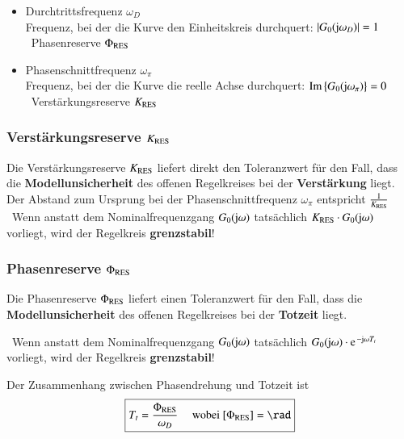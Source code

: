 \begin{itemize}
    \item Durchtrittsfrequenz $\omega_{D}$ \\
        Frequenz, bei der die Kurve den Einheitskreis durchquert: $| G_{0}(\mathrm{j} \omega_{D})| = 1 $ \\
        \textrightarrow\ Phasenreserve $\Phi_{\rm RES}$
    
    \item Phasenschnittfrequenz $\omega_{\pi}$ \\
        Frequenz, bei der die Kurve die reelle Achse durchquert: $\operatorname{Im}\left\{G_{0}(\mathrm{j} \omega_{\pi})\right\} = 0$\\
        \textrightarrow\ Verstärkungsreserve $K_{\rm RES}$
\end{itemize}


\subsubsection{Verstärkungsreserve $K_{\rm RES}$}

Die Verstärkungsreserve $K_{\rm RES}$ liefert direkt den Toleranzwert für den Fall, dass die \textbf{Modellunsicherheit} des 
offenen Regelkreises bei der \textbf{Verstärkung} liegt. \\
Der Abstand zum Ursprung bei der Phasenschnittfrequenz $\omega_{\pi}$ entspricht $\frac{1}{K_{\rm RES}}$ \\
\textrightarrow\ Wenn anstatt dem Nominalfrequenzgang $G_0(\mathrm{j} \omega)$ tatsächlich $K_{\rm RES} \cdot G_0(\mathrm{j} \omega)$ vorliegt, wird der
Regelkreis \textbf{grenzstabil}!


\subsubsection{Phasenreserve $\Phi_{\rm RES}$}

Die Phasenreserve $\Phi_{\rm RES}$ liefert einen Toleranzwert für den Fall, dass die \\
\textbf{Modellunsicherheit} des offenen Regelkreises bei der \textbf{Totzeit} liegt.

\textrightarrow\ Wenn anstatt dem Nominalfrequenzgang $G_0(\mathrm{j} \omega)$ tatsächlich $G_0(\jimg \omega) \cdot \e^{- \jimg \omega T_t}$ vorliegt, 
wird der Regelkreis \textbf{grenzstabil}!
\bigskip

Der Zusammenhang zwischen Phasendrehung und Totzeit ist
$$ \boxed{ T_t = \frac{\Phi_{\rm RES}}{\omega_D}  \quad \text{ wobei } [\Phi_{\rm RES}] = \rad } $$



